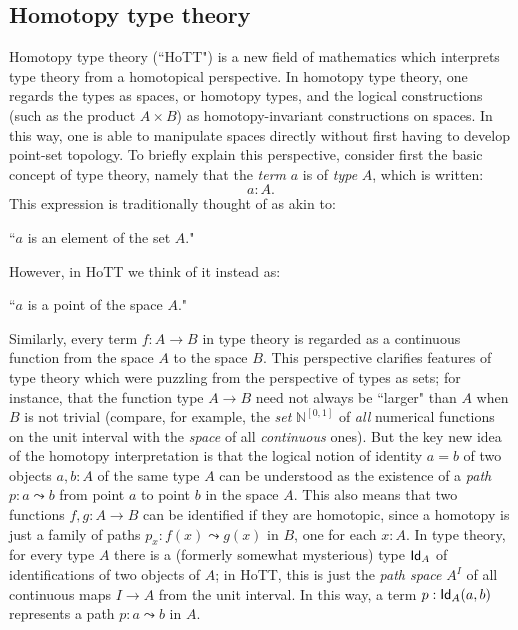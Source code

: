 {\subsection*{Homotopy type theory}

Homotopy type theory (``HoTT") is a new field of mathematics which interprets type theory from a homotopical perspective.
In homotopy type theory, one regards the types as spaces, or homotopy types, and the logical constructions (such as the product $A\times B$) as homotopy-invariant constructions on spaces.   In this way, one is able to manipulate spaces directly without first having to develop point-set topology.
To briefly explain this perspective, consider first the basic concept of type theory, namely that
the \emph{term} $a$ is of \emph{type} $A$, which is written:
$$
  a:A.
$$
This expression is traditionally thought of as akin to:
\begin{center}
``$a$ is an element of the set $A$."
\end{center}
However, in HoTT we think of it instead as:
\begin{center}
``$a$ is a point of the space $A$."
\end{center}
Similarly, every term $f : A\to B$ in type theory is regarded as a continuous function from the space $A$ to the space $B$. This perspective clarifies features of type theory which were puzzling from the perspective of types as sets; for instance, that the function type $A\to B$ need not always be ``larger" than $A$ when $B$ is not trivial (compare, for example, the \emph{set} $\mathbb{N}^{[0,1]}$ of \emph{all} numerical functions on the unit interval with the \emph{space} of all \emph{continuous} ones).  But the key new idea of the homotopy interpretation is that the logical notion of identity $a = b$ of two objects $a, b: A$ of the same type $A$ can be understood as the existence of a \emph{path} $p : a \leadsto b$ from point $a$ to point $b$ in the space $A$.  This also means that two functions $f, g: A\to B$ can be identified if they are homotopic, since a homotopy is just a family of paths $p_x: f(x) \leadsto g(x)$ in $B$, one for each $x:A$.  In type theory, for every type $A$ there is a (formerly somewhat mysterious) type ${{\sf Id}}_{A}$ of identifications of two objects of $A$; in HoTT, this is just the \emph{path space} $A^I$ of all continuous maps $I\to A$ from the unit interval.  In this way, a term $p : {{\sf Id}}_{A}(a,b)$ represents a path $p : a \leadsto b$ in $A$. 

}

